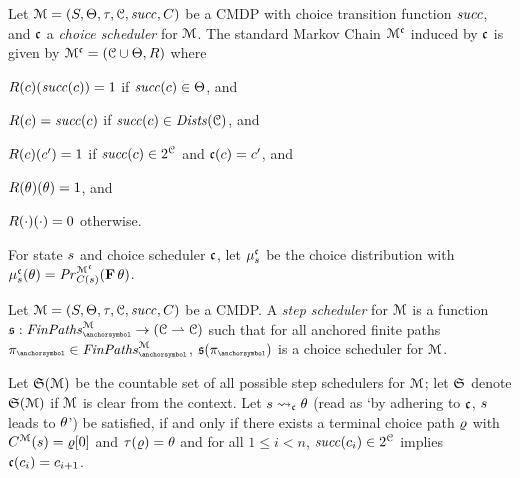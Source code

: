 \begin{definition}
\label{def:mc_of_choicescheduler}
Let $\mathcal{M}=(S, \Theta, \tau, \mathcal{C}, \mathit{succ}, C)$ be a CMDP with choice transition function $\mathit{succ}$, and $\mathfrak{c}$ a \emph{choice scheduler} for $\mathcal{M}$. The standard Markov Chain $\mathcal{M}^{\mathfrak{c}}$ induced by $\mathfrak{c}$ is given by
$\mathcal{M}^{\mathfrak{c}}=(\mathcal{C} \cup \Theta, R)$
where
\begin{compactitem}
\item       $R(c)(\mathit{succ}(c))=1$ if $\mathit{succ}(c) \in \Theta$, and
\item       $R(c)=\mathit{succ}(c)$ if $\mathit{succ}(c) \in \mathit{Dists}(\mathcal{C})$, and
\item       $R(c)(c')=1$ if $\mathit{succ}(c)\in 2^{\mathcal{C}}$ and $\mathfrak{c}(c)=c'$, and
\item       $R(\theta)(\theta)=1$, and
\item       $R(\cdot)(\cdot)=0$ otherwise.
\end{compactitem}
\end{definition}

For state $s$ and choice scheduler $\mathfrak{c}$, let $\mu^{\mathfrak{c}}_{s}$ be the choice distribution with $\mu^{\mathfrak{c}}_{s}(\theta)=\mathit{Pr}_{C(s)}^{\mathcal{M}^{\mathfrak{c}}}(\mathbf{F}\, \theta)$.


\begin{definition}
\label{def:CMDP_stepscheduler}
Let $\mathcal{M}=(S, \Theta, \tau, \mathcal{C}, \mathit{succ}, C)$ be a CMDP. A \emph{step scheduler} for $\mathcal{M}$ is a function $\StepScheduler : \CmdpAncFinPaths \rightarrow (\Choices \rightharpoonup \Choices)$ such that for all anchored finite paths $\ancfinpath \in \CmdpAncFinPaths$, $\StepScheduler(\ancfinpath)$ is a choice scheduler for $\mathcal{M}$.
\end{definition}
Let $\mathfrak{S}(\mathcal{M})$ be the countable set of all possible step schedulers for $\mathcal{M}$;
let $\mathfrak{S}$ denote $\mathfrak{S}(\mathcal{M})$ if $\mathcal{M}$ is clear from the context.
Let $s \rightsquigarrow_{\mathfrak{c}} \theta$ (read as `by adhering to $\mathfrak{c}$, $s$ leads to $\theta$') be satisfied, if and only if there exists a terminal choice path $\varrho$ with $C^{\mathcal{M}}(s)=\varrho[0]$ and $\tau(\varrho)=\theta$ and for all $1 \le i < n$, $\mathit{succ}(c_i)\in 2^{\mathcal{C}}$ implies $\mathfrak{c}(c_i)=c_{i+1}$.

